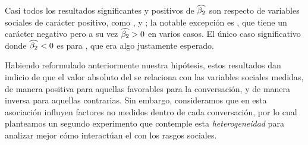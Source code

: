 Casi todos los resultados significantes y positivos de $\widehat{\beta_2}$ son respecto de variables sociales de carácter positivo, como \svclear, \svengaged y \svencourages; la notable excepción es \svdifficult, que tiene un carácter negativo pero a su vez $\widehat{\beta_2} > 0$ en varios casos. El único caso significativo donde $\widehat{\beta_2} < 0$ es para \svbored, que era algo justamente esperado.

Habiendo reformulado anteriormente nuestra hipótesis, estos resultados dan indicio de que el valor absoluto del \entrainment se relaciona con las variables sociales medidas, de manera positiva para aquellas favorables para la conversación, y de manera inversa para aquellas contrarias. Sin embargo, consideramos que en esta asociación influyen factores no medidos dentro de cada conversación, por lo cual planteamos un segundo experimento que contemple esta \emph{heterogeneidad} para analizar mejor cómo interactúan el \entrainment con los rasgos sociales. 






